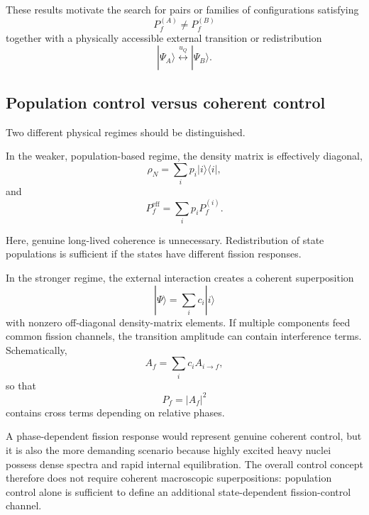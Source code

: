 These results motivate the search for pairs or families of configurations satisfying
\begin{equation}
P_f^{(A)}
\neq
P_f^{(B)}
\end{equation}
together with a physically accessible external transition or redistribution
\begin{equation}
|\Psi_A\rangle
\overset{u_Q}{\longleftrightarrow}
|\Psi_B\rangle.
\end{equation}

\subsection{Population control versus coherent control}

Two different physical regimes should be distinguished.

In the weaker, population-based regime, the density matrix is effectively diagonal,
\begin{equation}
\rho_N
=
\sum_i
p_i
|i\rangle\langle i|,
\end{equation}
and
\begin{equation}
P_f^{\mathrm{eff}}
=
\sum_i
p_i P_f^{(i)}.
\end{equation}

Here, genuine long-lived coherence is unnecessary. Redistribution of state populations is sufficient if the states have different fission responses.

In the stronger regime, the external interaction creates a coherent superposition
\begin{equation}
|\Psi\rangle
=
\sum_i c_i|i\rangle
\end{equation}
with nonzero off-diagonal density-matrix elements. If multiple components feed common fission channels, the transition amplitude can contain interference terms. Schematically,
\begin{equation}
A_f
=
\sum_i c_i A_{i\rightarrow f},
\end{equation}
so that
\begin{equation}
P_f
=
|A_f|^2
\end{equation}
contains cross terms depending on relative phases.

A phase-dependent fission response would represent genuine coherent control, but it is also the more demanding scenario because highly excited heavy nuclei possess dense spectra and rapid internal equilibration. The overall control concept therefore does not require coherent macroscopic superpositions: population control alone is sufficient to define an additional state-dependent fission-control channel.

